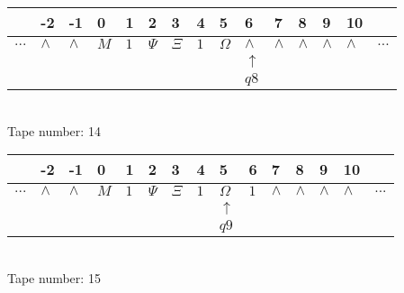 \documentclass{article}
\begin{document}
\begin{table}[H]
\centering
\begin{tabular}{lllllllllllllll}
 & -2 & -1 & 0 & 1 & 2 & 3 & 4 & 5 & 6 & 7 & 8 & 9 & 10 & \\
\hline
$...$ & \multicolumn{1}{|l|}{$\wedge$} & \multicolumn{1}{|l|}{$\wedge$} & \multicolumn{1}{|l|}{$M$} & \multicolumn{1}{|l|}{$1$} & \multicolumn{1}{|l|}{$\Psi$} & \multicolumn{1}{|l|}{$\Xi$} & \multicolumn{1}{|l|}{$1$} & \multicolumn{1}{|l|}{$\Omega$} & \multicolumn{1}{|l|}{$\wedge$} & \multicolumn{1}{|l|}{$\wedge$} & \multicolumn{1}{|l|}{$\wedge$} & \multicolumn{1}{|l|}{$\wedge$} & \multicolumn{1}{|l|}{$\wedge$} & $...$\\
\hline
&  &  &  &  &  &  &  &  & $\uparrow$ &  &  &  &  &  \\
&  &  &  &  &  &  &  &  & $ q8 $ &  &  &  &  &  \\
\end{tabular}
\\
Tape number: 14
\noindent\makebox[\linewidth]{\hdashrule{\textwidth}{1pt}{1pt}}\end{table}

\begin{table}[H]
\centering
\begin{tabular}{lllllllllllllll}
 & -2 & -1 & 0 & 1 & 2 & 3 & 4 & 5 & 6 & 7 & 8 & 9 & 10 & \\
\hline
$...$ & \multicolumn{1}{|l|}{$\wedge$} & \multicolumn{1}{|l|}{$\wedge$} & \multicolumn{1}{|l|}{$M$} & \multicolumn{1}{|l|}{$1$} & \multicolumn{1}{|l|}{$\Psi$} & \multicolumn{1}{|l|}{$\Xi$} & \multicolumn{1}{|l|}{$1$} & \multicolumn{1}{|l|}{$\Omega$} & \multicolumn{1}{|l|}{$1$} & \multicolumn{1}{|l|}{$\wedge$} & \multicolumn{1}{|l|}{$\wedge$} & \multicolumn{1}{|l|}{$\wedge$} & \multicolumn{1}{|l|}{$\wedge$} & $...$\\
\hline
&  &  &  &  &  &  &  & $\uparrow$ &  &  &  &  &  &  \\
&  &  &  &  &  &  &  & $ q9 $ &  &  &  &  &  &  \\
\end{tabular}
\\
Tape number: 15
\noindent\makebox[\linewidth]{\hdashrule{\textwidth}{1pt}{1pt}}\end{table}
\end{document}
